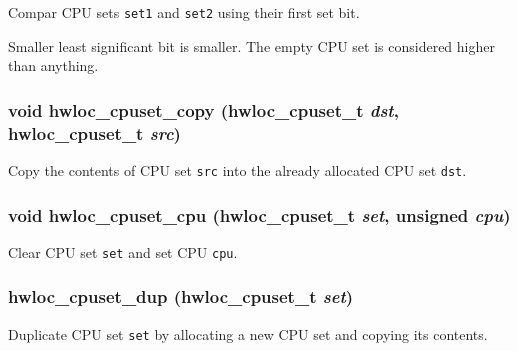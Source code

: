 Compar CPU sets {\tt set1} and {\tt set2} using their first set bit. 

Smaller least significant bit is smaller. The empty CPU set is considered higher than anything. \hypertarget{group__hwlocality__cpuset_gdad3d25553afca090a81ffa270208f2e}{
\subsubsection[{hwloc\_\-cpuset\_\-copy}]{\setlength{\rightskip}{0pt plus 5cm}void hwloc\_\-cpuset\_\-copy ({\bf hwloc\_\-cpuset\_\-t} {\em dst}, \/  {\bf hwloc\_\-cpuset\_\-t} {\em src})}}
\label{group__hwlocality__cpuset_gdad3d25553afca090a81ffa270208f2e}


Copy the contents of CPU set {\tt src} into the already allocated CPU set {\tt dst}. 

\hypertarget{group__hwlocality__cpuset_g212f2df54a64817dd094550a51b32c4f}{
\subsubsection[{hwloc\_\-cpuset\_\-cpu}]{\setlength{\rightskip}{0pt plus 5cm}void hwloc\_\-cpuset\_\-cpu ({\bf hwloc\_\-cpuset\_\-t} {\em set}, \/  unsigned {\em cpu})}}
\label{group__hwlocality__cpuset_g212f2df54a64817dd094550a51b32c4f}


Clear CPU set {\tt set} and set CPU {\tt cpu}. 

\hypertarget{group__hwlocality__cpuset_g19d8c163e4834ba69c808560aa5a89b3}{
\subsubsection[{hwloc\_\-cpuset\_\-dup}]{ hwloc\_\-cpuset\_\-dup ({\bf hwloc\_\-cpuset\_\-t} {\em set})}}
\label{group__hwlocality__cpuset_g19d8c163e4834ba69c808560aa5a89b3}


Duplicate CPU set {\tt set} by allocating a new CPU set and copying its contents. 

